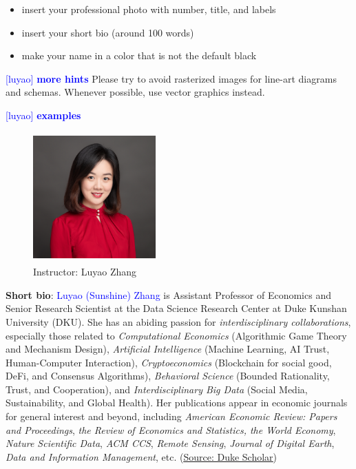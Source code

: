 \documentclass[runningheads]{llncs}
\newcommand{\luyao}[1]{\textcolor{blue}{[luyao] #1}}
\newcommand{\luyao}[1]{}
\begin{document}
\begin{itemize}
    \item insert your professional photo with number, title, and labels
    \item insert your short bio (around 100 words) 
    \item make your name in a color that is not the default black
\end{itemize}
\luyao{\textbf{more hints}}
Please try to avoid rasterized images for line-art diagrams and
schemas. Whenever possible, use vector graphics instead.
\newpage

\noindent\luyao{\textbf{examples}}

\begin{figure}
\centering
\includegraphics[width=4.7cm, height=5cm]{figs/fig1.jpg}
\caption{Instructor: Luyao Zhang} \label{fig:1}
\end{figure}


\noindent \textbf{Short bio}: \textcolor{blue}{Luyao (Sunshine) Zhang} is Assistant Professor of Economics and Senior Research Scientist at the Data Science Research Center at Duke Kunshan University (DKU). She has an abiding passion for \textit{interdisciplinary collaborations}, especially those related to \textit{Computational Economics} (Algorithmic Game Theory and Mechanism Design), \textit{Artificial Intelligence} (Machine Learning, AI Trust, Human-Computer Interaction), \textit{Cryptoeconomics} (Blockchain for social good, DeFi, and Consensus Algorithms), \textit{Behavioral Science} (Bounded Rationality, Trust, and Cooperation), and \textit{Interdisciplinary Big Data} (Social Media, Sustainability, and Global Health). Her publications appear in economic journals for general interest and beyond, including \emph{American Economic Review: Papers and Proceedings}, \emph{the Review of Economics and Statistics, the World Economy}, \textit{Nature Scientific Data}, \emph{ACM CCS},  \textit{Remote Sensing}, \emph{Journal of Digital Earth}, \textit{Data and Information Management}, etc. (\href{https://scholars.duke.edu/person/luyao.zhang}{\underline{Source: Duke Scholar}})
\end{document}
